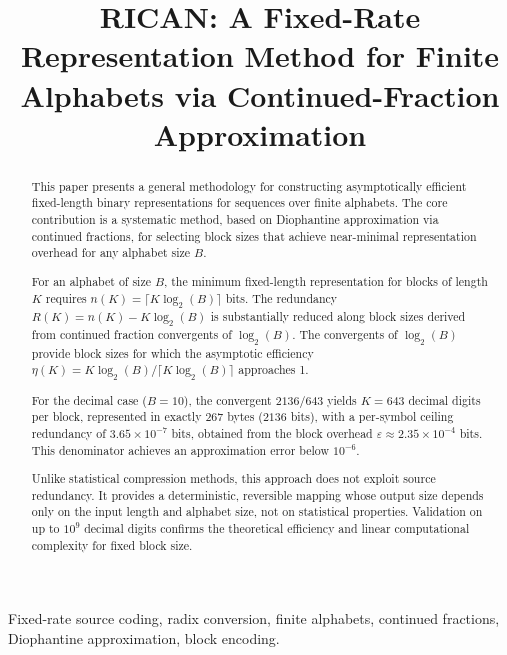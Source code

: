 \documentclass[10pt, conference]{IEEEtran}
\begin{document}
\title{RICAN: A Fixed-Rate Representation Method for Finite Alphabets via Continued-Fraction Approximation}

\author{
}

\maketitle

\begin{abstract}
This paper presents a general methodology for constructing asymptotically efficient fixed-length binary representations for sequences over finite alphabets. The core contribution is a systematic method, based on Diophantine approximation via continued fractions, for selecting block sizes that achieve near-minimal representation overhead for any alphabet size $B$.

For an alphabet of size $B$, the minimum fixed-length representation for blocks of length $K$ requires $n(K)=\lceil K\log_2(B)\rceil$ bits. The redundancy $R(K)=n(K)-K\log_2(B)$ is substantially reduced along block sizes derived from continued fraction convergents of $\log_2(B)$. The convergents of $\log_2(B)$ provide block sizes for which the asymptotic efficiency $\eta(K)=K\log_2(B)/\lceil K\log_2(B)\rceil$ approaches 1.

For the decimal case ($B=10$), the convergent $2136/643$ yields $K=643$ decimal digits per block, represented in exactly $267$ bytes ($2136$ bits), with a per-symbol ceiling redundancy of $3.65\times10^{-7}$ bits, obtained from the block overhead $\varepsilon \approx 2.35\times10^{-4}$ bits. This denominator achieves an approximation error below $10^{-6}$.

Unlike statistical compression methods, this approach does not exploit source redundancy. It provides a deterministic, reversible mapping whose output size depends only on the input length and alphabet size, not on statistical properties. Validation on up to $10^9$ decimal digits confirms the theoretical efficiency and linear computational complexity for fixed block size.
\end{abstract}

\begin{IEEEkeywords}
Fixed-rate source coding, radix conversion, finite alphabets, continued fractions, Diophantine approximation, block encoding.
\end{IEEEkeywords}
\end{document}
